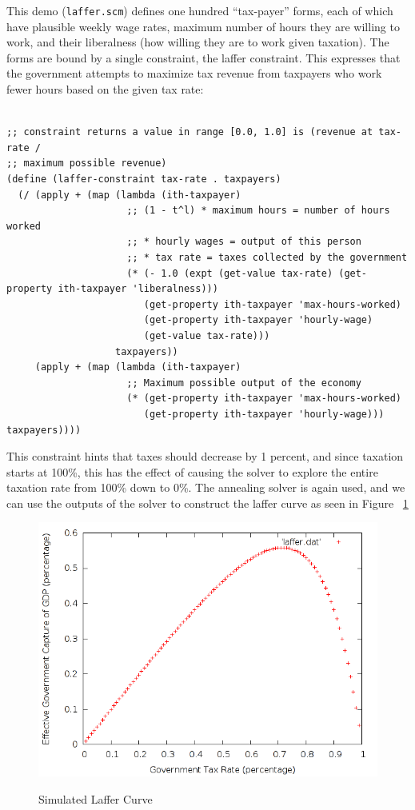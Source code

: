 \documentclass[12pt,a4paper]{article}
\begin{document}
This demo (\texttt{laffer.scm}) defines one hundred ``tax-payer'' forms, each of which have plausible weekly wage rates, maximum number of hours they are willing to work, and their liberalness (how willing they are to work given taxation).  The forms are bound by a single constraint, the laffer constraint. This expresses that the government attempts to maximize tax revenue from taxpayers who work fewer hours based on the given tax rate:
\begin{lstlisting}

;; constraint returns a value in range [0.0, 1.0] is (revenue at tax-rate /
;; maximum possible revenue)
(define (laffer-constraint tax-rate . taxpayers)
  (/ (apply + (map (lambda (ith-taxpayer)
                     ;; (1 - t^l) * maximum hours = number of hours worked
                     ;; * hourly wages = output of this person
                     ;; * tax rate = taxes collected by the government
                     (* (- 1.0 (expt (get-value tax-rate) (get-property ith-taxpayer 'liberalness)))
                        (get-property ith-taxpayer 'max-hours-worked)
                        (get-property ith-taxpayer 'hourly-wage)
                        (get-value tax-rate)))
                   taxpayers))
     (apply + (map (lambda (ith-taxpayer)
                     ;; Maximum possible output of the economy
                     (* (get-property ith-taxpayer 'max-hours-worked)
                        (get-property ith-taxpayer 'hourly-wage))) taxpayers))))
\end{lstlisting}

This constraint hints that taxes should decrease by 1 percent, and since taxation starts at 100\%, this has the effect of causing the solver to explore the entire taxation rate from 100\% down to 0\%.  The annealing solver is again used, and we can use the outputs of the solver to construct the laffer curve as seen in Figure ~\ref{fig:laffer}

\begin{figure}[H]
\caption{Simulated Laffer Curve}
\centering
\includegraphics[scale=.5]{../demos/laffer.png}
\label{fig:laffer}
\end{figure}
\end{document}
